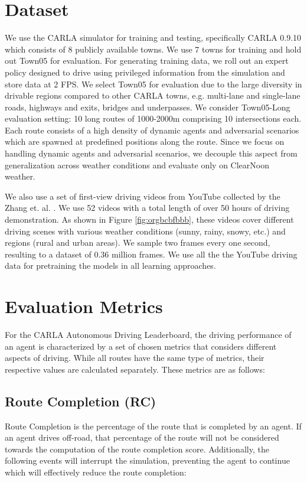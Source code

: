 \documentclass[12pt, letterpaper,cleardoubleempty,BCOR1cm]{scrbook}
\begin{document}
\section{Dataset \label{org9b7d054}}
\label{sec:org5d0a4bd}
We use the CARLA \cite{Dosovitskiy2017} simulator for training and testing,
specifically CARLA 0.9.10 which consists of 8 publicly available towns. We use 7
towns for training and hold out Town05 for evaluation. For generating training
data, we roll out an expert policy designed to drive using privileged
information from the simulation and store data at 2 FPS. We select Town05 for
evaluation due to the large diversity in drivable regions compared to other
CARLA towns, e.g. multi-lane and single-lane roads, highways and exits, bridges
and underpasses. We consider Town05-Long evaluation setting: 10 long routes of
1000-2000m comprising 10 intersections each. Each route consists of a high
density of dynamic agents and adversarial scenarios which are spawned at
predefined positions along the route. Since we focus on handling dynamic agents
and adversarial scenarios, we decouple this aspect from generalization across
weather conditions and evaluate only on ClearNoon weather.

We also use a set of first-view driving videos from YouTube collected by the
Zhang et. al. \cite{Zhang2022}. We use 52 videos with a total length of over 50
hours of driving demonstration. As shown in Figure \ref{fig:orgbcbfbbb}, these videos
cover different driving scenes with various weather conditions (sunny, rainy,
snowy, etc.) and regions (rural and urban areas). We sample two frames every one
second, resulting to a dataset of 0.36 million frames. We use all the the
YouTube driving data for pretraining the models in all learning approaches.

\section{Evaluation Metrics \label{orge7e1754}}
\label{sec:org6df9562}
For the CARLA Autonomous Driving Leaderboard, the driving performance of an
agent is characterized by a set of chosen metrics that considers different
aspects of driving. While all routes have the same type of metrics, their
respective values are calculated separately. These metrics are as follows:

\subsection{Route Completion (RC)}
\label{sec:orga4b2115}
Route Completion is the percentage of the route that is completed by an
agent. If an agent drives off-road, that percentage of the route will not be
considered towards the computation of the route completion score. Additionally,
the following events will interrupt the simulation, preventing the agent to
continue which will effectively reduce the route completion:
\end{document}
